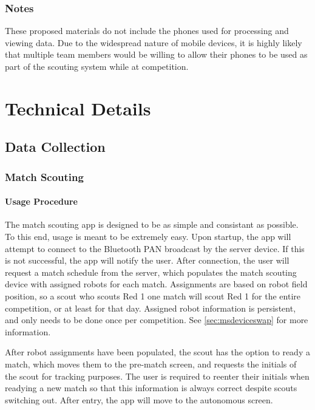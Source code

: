 \documentclass[11pt]{report}
\begin{document}
\subsection{Notes}

These proposed materials do not include the phones used for processing and viewing data. Due to the widespread nature of mobile devices, it is highly likely that multiple team members would be willing to allow their phones to be used as part of the scouting system while at competition.


\chapter{Technical Details}

\section{Data Collection}
\subsection{Match Scouting}

\subsubsection{Usage Procedure}

The match scouting app is designed to be as simple and consistant as possible. To this end, usage is meant to be extremely easy. Upon startup, the app will attempt to connect to the Bluetooth PAN broadcast by the server device. If this is not successful, the app will notify the user. After connection, the user will request a match schedule from the server, which populates the match scouting device with assigned robots for each match. Assignments are based on robot field position, so a scout who scouts Red 1 one match will scout Red 1 for the entire competition, or at least for that day. Assigned robot information is persistent, and only needs to be done once per competition. See \autoref{sec:msdeviceswap} for more information.

After robot assignments have been populated, the scout has the option to ready a match, which moves them to the pre-match screen, and requests the initials of the scout for tracking purposes. The user is required to reenter their initials when readying a new match so that this information is always correct despite scouts switching out. After entry, the app will move to the autonomous screen.
\end{document}
